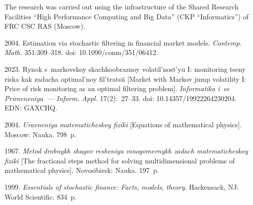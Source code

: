 


\vspace*{-20pt}

\Ack

\vspace*{-3pt}

\noindent
The research was carried out using the infrastructure of the Shared Research Facilities 
``High Performance Computing and Big Data'' (CKP ``Informatics'') of FRC CSC RAS (Moscow).
  


  \begin{multicols}{2}

\renewcommand{\bibname}{\protect\rmfamily References}

{\small\frenchspacing
 {%
 \begin{thebibliography}{99} 

 2004. Estimation via stochastic filtering in financial market models. \textit{Contemp. Math.} 351:309--318.
doi: 10.1090/conm/351/06412.

 2023. Ry\-nok s~mar\-kov\-skoy skach\-ko\-ob\-raz\-noy vo\-la\-til'\-nost'yu I: mo\-ni\-to\-ring tse\-ny ris\-ka kak za\-da\-cha 
op\-ti\-mal'\-noy fil't\-ra\-tsii 
[Market with Markov jump volatility I: Price of risk monitoring as an optimal filtering problem]. \textit{Informatika i~ee Primeneniya~--- Inform. Appl.} 17(2):~27--33. 
doi:   10.14357/19922264230204. EDN: GAXCHQ.



 2004.  \textit{Urav\-ne\-niya ma\-te\-ma\-ti\-che\-skoy fi\-zi\-ki} 
[Equations of mathematical physics]. Moscow: Nauka. 798~p.

 1967. \textit{Me\-tod drob\-nykh sha\-gov re\-she\-niya mno\-go\-mer\-nykh za\-dach ma\-te\-ma\-ti\-che\-skoy fi\-zi\-ki}
 [The fractional steps method for solving multidimensional problems of mathematical physics]. Novosibirsk: Nauka. 197~p.

 1999. \textit{Essentials of stochastic finance: Facts, models, theory}. Hackensack, NJ: World Scientific. 834~p.


\end{thebibliography}}}
\end{multicols}
